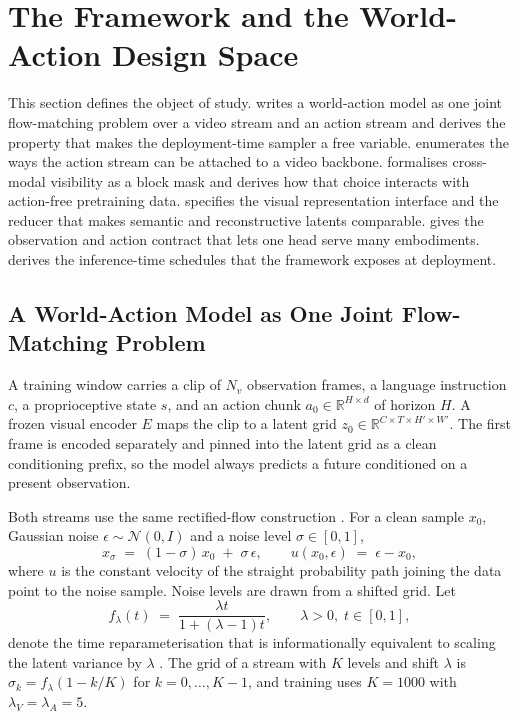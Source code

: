 \section{The \sys{} Framework and the World-Action Design Space}
\label{sec:framework}

This section defines the object of study.  writes a
world-action model as one joint flow-matching problem over a video stream and an
action stream and derives the property that makes the deployment-time sampler a
free variable.  enumerates the ways the action stream can be
attached to a video backbone.  formalises cross-modal visibility
as a block mask and derives how that choice interacts with action-free
pretraining data.  specifies the visual representation interface
and the reducer that makes semantic and reconstructive latents comparable.
 gives the observation and action contract that lets one head
serve many embodiments.  derives the inference-time schedules
that the framework exposes at deployment.

\subsection{A World-Action Model as One Joint Flow-Matching Problem}
\label{sec:jointfm}

A training window carries a clip of $N_v$ observation frames, a language
instruction $c$, a proprioceptive state $s$, and an action chunk
$a_0 \in \mathbb{R}^{H \times d}$ of horizon $H$. A frozen visual encoder
$E$ maps the clip to a latent grid
$z_0 \in \mathbb{R}^{C \times T \times H' \times W'}$. The first frame is
encoded separately and pinned into the latent grid as a clean conditioning
prefix, so the model always predicts a future conditioned on a present
observation.

Both streams use the same rectified-flow construction
\citep{lipman2023flowmatching,liu2023rectifiedflow}. For a clean sample $x_0$,
Gaussian noise $\epsilon \sim \mathcal{N}(0, I)$ and a noise level
$\sigma \in [0,1]$,
\begin{equation}
  x_\sigma \;=\; (1-\sigma)\, x_0 \;+\; \sigma\, \epsilon,
  \qquad
  u(x_0, \epsilon) \;=\; \epsilon - x_0 ,
  \label{eq:fm}
\end{equation}
where $u$ is the constant velocity of the straight probability path joining the
data point to the noise sample. Noise levels are drawn from a shifted grid. Let
\begin{equation}
  f_\lambda(t) \;=\; \frac{\lambda t}{1 + (\lambda - 1) t},
  \qquad \lambda > 0, \; t \in [0,1] ,
  \label{eq:shift}
\end{equation}
denote the time reparameterisation that is informationally equivalent to
scaling the latent variance by $\lambda$ \citep{esser2024sd3}. The grid of a
stream with $K$ levels and shift $\lambda$ is
$\sigma_k = f_\lambda\!\left(1 - k/K\right)$ for $k = 0, \dots, K-1$, and
training uses $K = 1000$ with $\lambda_V = \lambda_A = 5$.

